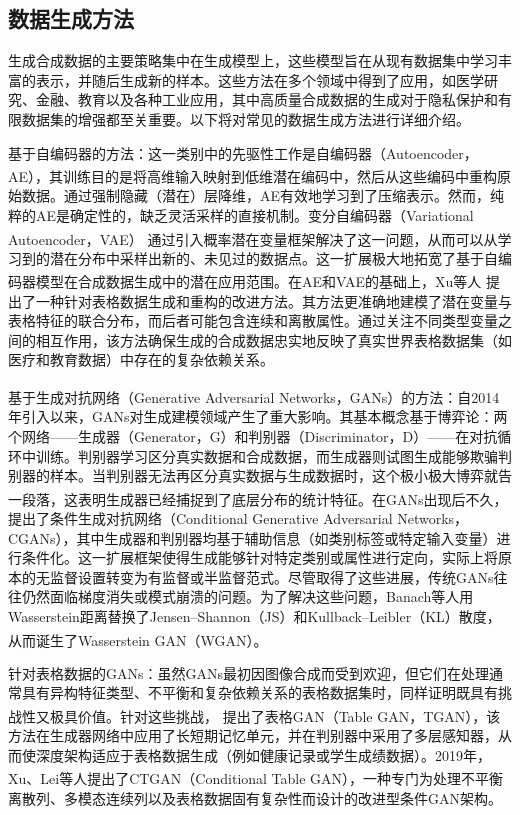 \subsection{数据生成方法}
生成合成数据的主要策略集中在生成模型上，这些模型旨在从现有数据集中学习丰富的表示，并随后生成新的样本。这些方法在多个领域中得到了应用，如医学研究、金融、教育以及各种工业应用，其中高质量合成数据的生成对于隐私保护和有限数据集的增强都至关重要。以下将对常见的数据生成方法进行详细介绍。

基于自编码器的方法：这一类别中的先驱性工作是自编码器（Autoencoder，AE）\textsuperscript{\cite{hinton2006reducing}}，其训练目的是将高维输入映射到低维潜在编码中，然后从这些编码中重构原始数据。通过强制隐藏（潜在）层降维，AE有效地学习到了压缩表示。然而，纯粹的AE是确定性的，缺乏灵活采样的直接机制。变分自编码器（Variational Autoencoder，VAE）\textsuperscript{\cite{kingma2013auto}} 通过引入概率潜在变量框架解决了这一问题，从而可以从学习到的潜在分布中采样出新的、未见过的数据点。这一扩展极大地拓宽了基于自编码器模型在合成数据生成中的潜在应用范围。在AE和VAE的基础上，Xu等人\textsuperscript{\cite{xu2019modeling}} 提出了一种针对表格数据生成和重构的改进方法。其方法更准确地建模了潜在变量与表格特征的联合分布，而后者可能包含连续和离散属性。通过关注不同类型变量之间的相互作用，该方法确保生成的合成数据忠实地反映了真实世界表格数据集（如医疗和教育数据）中存在的复杂依赖关系。

基于生成对抗网络（Generative Adversarial Networks，GANs）\textsuperscript{\cite{goodfellow2014generative}}的方法：自2014年引入以来，GANs对生成建模领域产生了重大影响。其基本概念基于博弈论：两个网络——生成器（Generator，G）和判别器（Discriminator，D）——在对抗循环中训练。判别器学习区分真实数据和合成数据，而生成器则试图生成能够欺骗判别器的样本。当判别器无法再区分真实数据与生成数据时，这个极小极大博弈就告一段落，这表明生成器已经捕捉到了底层分布的统计特征。在GANs出现后不久，\textsuperscript{\cite{mirza2014conditional}} 提出了条件生成对抗网络（Conditional Generative Adversarial Networks，CGANs），其中生成器和判别器均基于辅助信息（如类别标签或特定输入变量）进行条件化。这一扩展框架使得生成能够针对特定类别或属性进行定向，实际上将原本的无监督设置转变为有监督或半监督范式。尽管取得了这些进展，传统GANs往往仍然面临梯度消失或模式崩溃的问题。为了解决这些问题，Banach等人用Wasserstein距离替换了Jensen–Shannon（JS）和Kullback–Leibler（KL）散度，从而诞生了Wasserstein GAN（WGAN）\textsuperscript{\cite{adler2018banach,arjovsky2017towards}}。

针对表格数据的GANs：虽然GANs最初因图像合成而受到欢迎，但它们在处理通常具有异构特征类型、不平衡和复杂依赖关系的表格数据集时，同样证明既具有挑战性又极具价值。针对这些挑战，\textsuperscript{\cite{xu2018synthesizing}} 提出了表格GAN（Table GAN，TGAN），该方法在生成器网络中应用了长短期记忆单元，并在判别器中采用了多层感知器，从而使深度架构适应于表格数据生成（例如健康记录或学生成绩数据）。2019年，Xu、Lei等人\textsuperscript{\cite{xu2019modeling}}提出了CTGAN（Conditional Table GAN），一种专门为处理不平衡离散列、多模态连续列以及表格数据固有复杂性而设计的改进型条件GAN架构。

